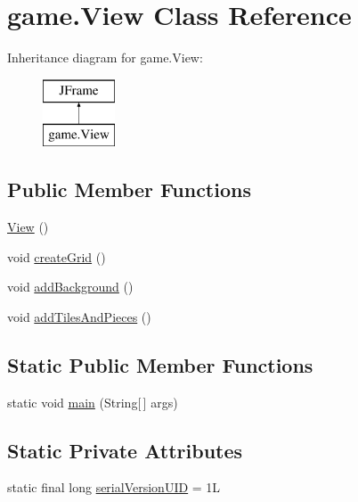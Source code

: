 \hypertarget{classgame_1_1_view}{\section{game.\-View Class Reference}
\label{classgame_1_1_view}
}
Inheritance diagram for game.\-View\-:\begin{figure}[H]
\begin{center}
\leavevmode
\includegraphics[height=2.000000cm]{classgame_1_1_view}
\end{center}
\end{figure}
\subsection*{Public Member Functions}
\begin{DoxyCompactItemize}
\item 
\hyperlink{classgame_1_1_view_ae98e349991a7bb479841ff645d63936f}{View} ()
\item 
void \hyperlink{classgame_1_1_view_ad5ab78858233ac503470be916be37900}{create\-Grid} ()
\item 
void \hyperlink{classgame_1_1_view_a63f511aceacaf6c17b328bc2d90ae0cc}{add\-Background} ()
\item 
void \hyperlink{classgame_1_1_view_a3abf8aeda578ce649890de43499cae26}{add\-Tiles\-And\-Pieces} ()
\end{DoxyCompactItemize}
\subsection*{Static Public Member Functions}
\begin{DoxyCompactItemize}
\item 
static void \hyperlink{classgame_1_1_view_ac07fbd14e6ae8c999bf908387cbb2995}{main} (String\mbox{[}$\,$\mbox{]} args)
\end{DoxyCompactItemize}
\subsection*{Static Private Attributes}
\begin{DoxyCompactItemize}
\item 
static final long \hyperlink{classgame_1_1_view_acce802e821f57f85f45a307314f81b50}{serial\-Version\-U\-I\-D} = 1\-L
\end{DoxyCompactItemize}


